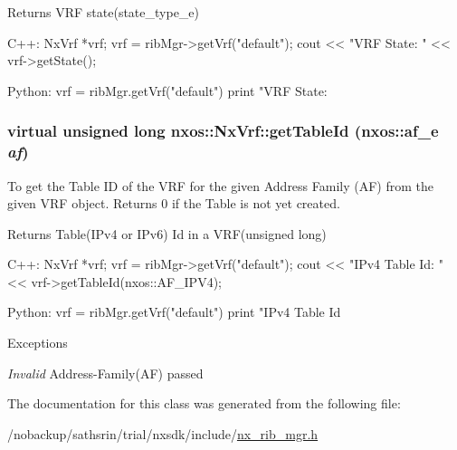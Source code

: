 \begin{DoxyReturn}{Returns}
VRF state(state\_\-type\_\-e)
\end{DoxyReturn}

\begin{DoxyCode}
  C++:
       NxVrf *vrf;
       vrf = ribMgr->getVrf("default");
       cout << "VRF State: " << vrf->getState();

  Python:
       vrf = ribMgr.getVrf("default")
       print "VRF State: %
\end{DoxyCode}
 \hypertarget{classnxos_1_1NxVrf_a6f1529908decf0dfb531e674440d82ed}{
\subsubsection[{getTableId}]{\setlength{\rightskip}{0pt plus 5cm}virtual unsigned long nxos::NxVrf::getTableId (nxos::af\_\-e {\em af})}}
\label{classnxos_1_1NxVrf_a6f1529908decf0dfb531e674440d82ed}
To get the Table ID of the VRF for the given Address Family (AF) from the given VRF object. Returns 0 if the Table is not yet created.

\begin{DoxyReturn}{Returns}
Table(IPv4 or IPv6) Id in a VRF(unsigned long)
\end{DoxyReturn}

\begin{DoxyCode}
  C++:
       NxVrf *vrf;
       vrf = ribMgr->getVrf("default");
       cout << "IPv4 Table Id: " << vrf->getTableId(nxos::AF_IPV4);

  Python:
       vrf = ribMgr.getVrf("default")
       print "IPv4 Table Id %
\end{DoxyCode}



\begin{DoxyExceptions}{Exceptions}
\item[{\em Invalid}]Address-\/Family(AF) passed \end{DoxyExceptions}


The documentation for this class was generated from the following file:\begin{DoxyCompactItemize}
\item 
/nobackup/sathsrin/trial/nxsdk/include/\hyperlink{nx__rib__mgr_8h}{nx\_\-rib\_\-mgr.h}\end{DoxyCompactItemize}
